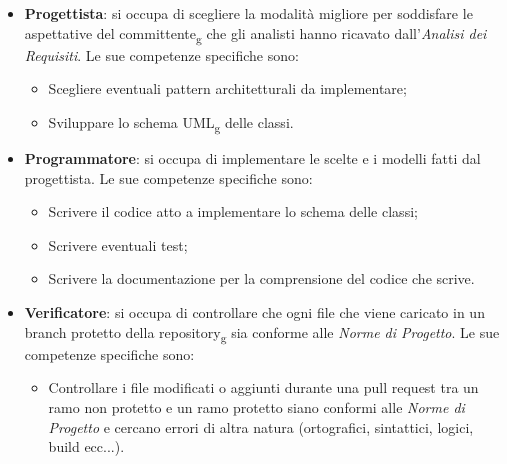 \begin{itemize}
\item \textbf{Progettista}: si occupa di scegliere la modalità migliore per soddisfare le aspettative del committente\textsubscript{g} che gli analisti hanno ricavato dall'\textit{Analisi dei Requisiti}. Le sue competenze specifiche sono:
\begin{itemize}
	\item Scegliere eventuali pattern architetturali da implementare;
	\item Sviluppare lo schema UML\textsubscript{g} delle classi.
\end{itemize}

\item \textbf{Programmatore}: si occupa di implementare le scelte e i modelli fatti dal progettista. Le sue competenze specifiche sono:
\begin{itemize}
	\item Scrivere il codice atto a implementare lo schema delle classi;
	\item Scrivere eventuali test;
	\item Scrivere la documentazione per la comprensione del codice che scrive.
\end{itemize}

\item \textbf{Verificatore}: si occupa di controllare che ogni file che viene caricato in un branch protetto della repository\textsubscript{g} sia conforme alle \textit{Norme di Progetto}. Le sue competenze specifiche sono:
\begin{itemize}
	\item Controllare i file modificati o aggiunti durante una pull request tra un ramo non protetto e un ramo protetto siano conformi alle \textit{Norme di Progetto} e cercano errori di altra natura (ortografici, sintattici, logici, build ecc...).
\end{itemize}

\end{itemize}

